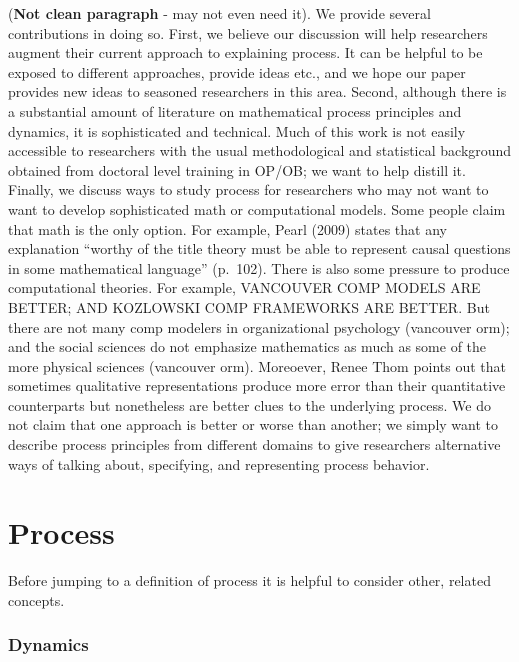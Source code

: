 \documentclass[english,,man]{apa6}
\theoremstyle{definition}
\theoremstyle{definition}
\theoremstyle{definition}
\theoremstyle{remark}
\begin{document}
(\textbf{Not clean paragraph} - may not even need it). We provide
several contributions in doing so. First, we believe our discussion will
help researchers augment their current approach to explaining process.
It can be helpful to be exposed to different approaches, provide ideas
etc., and we hope our paper provides new ideas to seasoned researchers
in this area. Second, although there is a substantial amount of
literature on mathematical process principles and dynamics, it is
sophisticated and technical. Much of this work is not easily accessible
to researchers with the usual methodological and statistical background
obtained from doctoral level training in OP/OB; we want to help distill
it. Finally, we discuss ways to study process for researchers who may
not want to want to develop sophisticated math or computational models.
Some people claim that math is the only option. For example, Pearl
(2009) states that any explanation \enquote{worthy of the title theory
must be able to represent causal questions in some mathematical
language} (p.~102). There is also some pressure to produce computational
theories. For example, VANCOUVER COMP MODELS ARE BETTER; AND KOZLOWSKI
COMP FRAMEWORKS ARE BETTER. But there are not many comp modelers in
organizational psychology (vancouver orm); and the social sciences do
not emphasize mathematics as much as some of the more physical sciences
(vancouver orm). Moreoever, Renee Thom points out that sometimes
qualitative representations produce more error than their quantitative
counterparts but nonetheless are better clues to the underlying process.
We do not claim that one approach is better or worse than another; we
simply want to describe process principles from different domains to
give researchers alternative ways of talking about, specifying, and
representing process behavior.

\hypertarget{process}{%
\section{Process}\label{process}}

Before jumping to a definition of process it is helpful to consider
other, related concepts.

\hypertarget{dynamics}{%
\subsubsection{Dynamics}\label{dynamics}}
\end{document}
